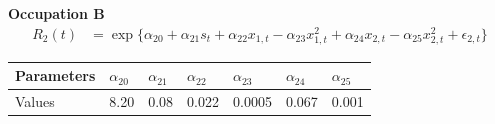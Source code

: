 \begin{frame}\vspace{0.3cm}

\textbf{Occupation B}\vspace{0.3cm}
\begin{align*}
R_2(t) & = \exp\{\alpha_{20} + \alpha_{21}s_t + \alpha_{22}x_{1,t} - \alpha_{23}x_{1,t}^2 + \alpha_{24}x_{2,t} - \alpha_{25}x_{2,t}^2 + \epsilon_{2,t}  \}
\end{align*}\vspace{-1.2cm}


\begin{center}
\begin{tabular}{L{1.8cm} C{1cm} C{1cm} C{1cm} C{1.2cm} C{1cm} C{1cm}}\toprule
Parameters  &  $\alpha_{20}$ &  $\alpha_{21}$ &  $\alpha_{22}$ &  $\alpha_{23}$ &  $\alpha_{24}$ &  $\alpha_{25}$ \\\midrule
    Values  &  8.20& 0.08&  0.022 &  0.0005  &  0.067 &  0.001\\\bottomrule
\end{tabular}
\end{center}


\end{frame}

